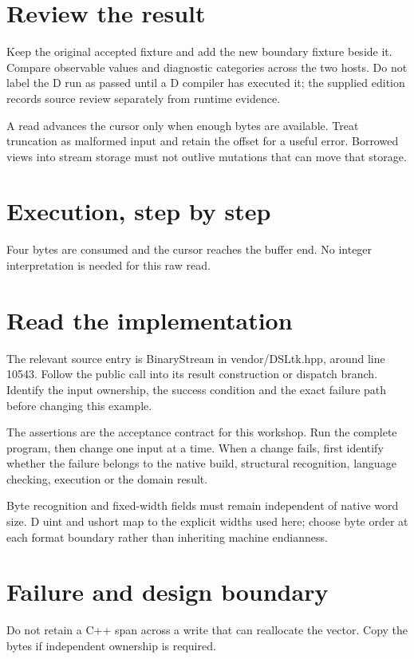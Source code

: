 \section*{Review the result}
Keep the original accepted fixture and add the new boundary fixture beside it. Compare observable values and diagnostic categories across the two hosts. Do not label the D run as passed until a D compiler has executed it; the supplied edition records source review separately from runtime evidence.

\clearpage
{}
A read advances the cursor only when enough bytes are available. Treat truncation as malformed input and retain the offset for a useful error. Borrowed views into stream storage must not outlive mutations that can move that storage.


\section*{Execution, step by step}
Four bytes are consumed and the cursor reaches the buffer end. No integer interpretation is needed for this raw read.

\section*{Read the implementation}
The relevant source entry is BinaryStream in vendor/DSLtk.hpp, around line 10543. Follow the public call into its result construction or dispatch branch. Identify the input ownership, the success condition and the exact failure path before changing this example.

The assertions are the acceptance contract for this workshop. Run the complete program, then change one input at a time. When a change fails, first identify whether the failure belongs to the native build, structural recognition, language checking, execution or the domain result.

\clearpage
{}
Byte recognition and fixed-width fields must remain independent of native word size. D uint and ushort map to the explicit widths used here; choose byte order at each format boundary rather than inheriting machine endianness.


\section*{Failure and design boundary}
Do not retain a C++ span across a write that can reallocate the vector. Copy the bytes if independent ownership is required.

